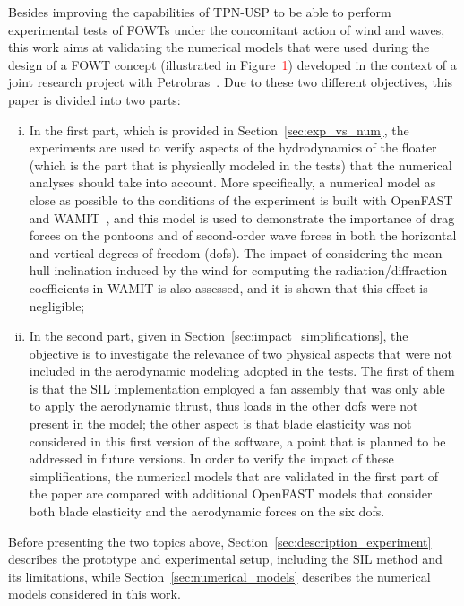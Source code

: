 Besides improving the capabilities of TPN-USP to be able to perform experimental tests of FOWTs under the concomitant action of wind and waves, this work aims at validating the numerical models that were used during the design of a FOWT concept (illustrated in Figure~\textcolor{red}{1}) developed in the context of a joint research project with Petrobras~\citep{mas2022parametric}. Due to these two different objectives, this paper is divided into two parts:
\begin{enumerate}[i.]
    \item In the first part, which is provided in Section~\ref{sec:exp_vs_num}, the experiments are used to verify aspects of the hydrodynamics of the floater (which is the part that is physically modeled in the tests) that the numerical analyses should take into account. More specifically, a numerical model as close as possible to the conditions of the experiment is built with OpenFAST~\cite{jonkman2005fast} and WAMIT~\cite{wamitManual}, and this model is used to demonstrate the importance of drag forces on the pontoons and of second-order wave forces in both the horizontal and vertical degrees of freedom (dofs). The impact of considering the mean hull inclination induced by the wind for computing the radiation/diffraction coefficients in WAMIT is also assessed, and it is shown that this effect is negligible;    
    \item In the second part, given in Section~\ref{sec:impact_simplifications}, the objective is to investigate the relevance of two physical aspects that were not included in the aerodynamic modeling adopted in the tests. The first of them is that the SIL implementation employed a fan assembly that was only able to apply the aerodynamic thrust, thus loads in the other dofs were not present in the model; the other aspect is that blade elasticity was not considered in this first version of the software, a point that is planned to be addressed in future versions. In order to verify the impact of these simplifications, the numerical models that are validated in the first part of the paper are compared with additional OpenFAST models that consider both blade elasticity and the aerodynamic forces on the six dofs.
\end{enumerate}

Before presenting the two topics above, Section~\ref{sec:description_experiment} describes the prototype and experimental setup, including the SIL method and its limitations, while Section~\ref{sec:numerical_models} describes the numerical models considered in this work. 